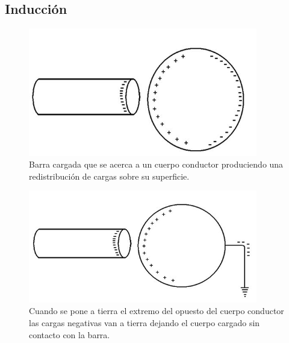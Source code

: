 \subsection{Inducción}
\begin{figure}[H]
	\centering
	\includegraphics[width=10cm]{Images/img4.JPG}
	\caption{Barra cargada que se acerca a un cuerpo conductor produciendo una redistribución de cargas sobre su superficie.}\label{}
\end{figure}
\begin{figure}[H]
	\centering
	\includegraphics[width=10cm]{Images/img5.JPG}
	\caption{Cuando se pone a tierra el extremo del opuesto del cuerpo conductor las cargas negativas van a tierra dejando el cuerpo cargado sin contacto con la barra.}\label{}
\end{figure}

